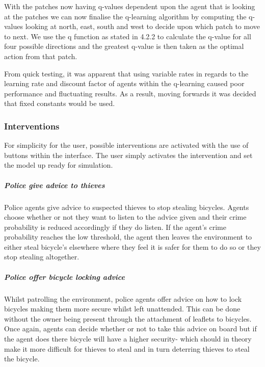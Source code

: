 \documentclass[11pt]{informatics-report}
\begin{document}
With the patches now having q-values dependent upon the agent that is looking at the patches we can now finalise the q-learning algorithm by computing the q-values looking at north, east, south and west to decide upon which patch to move to next. We use the q function as stated in 4.2.2 to calculate the q-value for all four possible directions and the greatest q-value is then taken as the optimal action from that patch. \par

From quick testing, it was apparent that using variable rates in regards to the learning rate and discount factor of agents within the q-learning caused poor performance and fluctuating results. As a result, moving forwards it was decided that fixed constants would be used.

\subsubsection{Interventions}
For simplicity for the user, possible interventions are activated with the use of buttons within the interface. The user simply activates the intervention and set the model up ready for simulation.

\subparagraph{Police give advice to thieves} 
\paragraph{}
Police agents give advice to suspected thieves to stop stealing bicycles. Agents choose whether or not they want to listen to the advice given and their crime probability is reduced accordingly if they do listen. If the agent's crime probability reaches the low threshold, the agent then leaves the environment to either steal bicycle's elsewhere where they feel it is safer for them to do so or they stop stealing altogether. 

\subparagraph{Police offer bicycle locking advice}
\paragraph{}
Whilst patrolling the environment, police agents offer advice on how to lock bicycles making them more secure whilst left unattended. This can be done without the owner being present through the attachment of leaflets to bicycles. Once again, agents can decide whether or not to take this advice on board but if the agent does there bicycle will have a higher security- which should in theory make it more difficult for thieves to steal and in turn deterring thieves to steal the bicycle.
\end{document}
